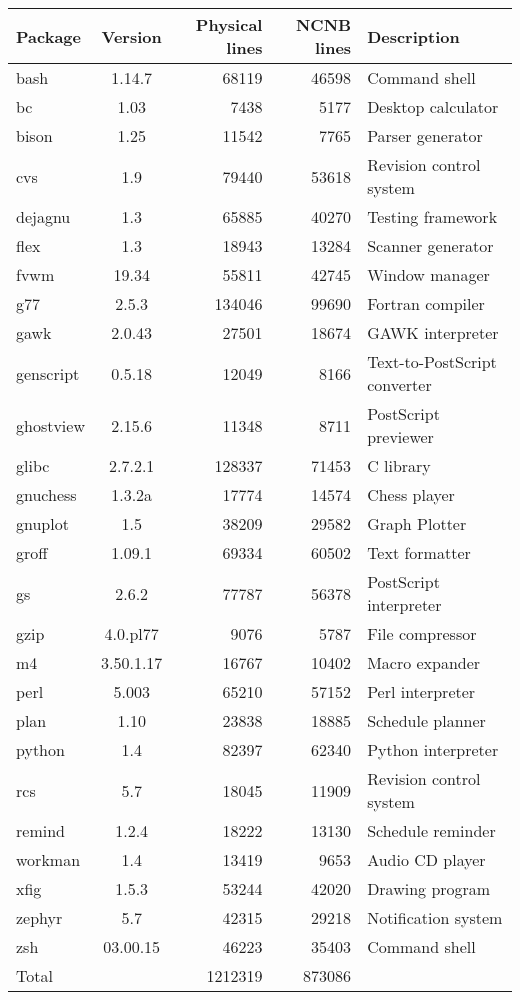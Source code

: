 \begin{tabular}{|l|c|r|r|l|}\hline
Package & Version  & Physical lines & NCNB lines & Description \\ \hline\hline
bash & 1.14.7 & 68119 & 46598 & Command shell \\ \hline
bc & 1.03 & 7438 & 5177 & Desktop calculator \\ \hline
bison & 1.25 & 11542 & 7765 & Parser generator \\ \hline
cvs & 1.9 & 79440 & 53618 & Revision control system \\ \hline
dejagnu & 1.3 & 65885 & 40270 & Testing framework \\ \hline
flex & 1.3 & 18943 & 13284 & Scanner generator \\ \hline
fvwm & 19.34 & 55811 & 42745 & Window manager \\ \hline
g77 & 2.5.3 & 134046 & 99690 & Fortran compiler \\ \hline
gawk & 2.0.43 & 27501 & 18674 & GAWK interpreter \\ \hline
genscript & 0.5.18 & 12049 & 8166 & Text-to-PostScript converter \\ \hline
ghostview & 2.15.6 & 11348 & 8711 & PostScript previewer \\ \hline
glibc & 2.7.2.1 & 128337 & 71453 & C library \\ \hline
gnuchess & 1.3.2a & 17774 & 14574 & Chess player \\ \hline
gnuplot & 1.5 & 38209 & 29582 & Graph Plotter \\ \hline
groff & 1.09.1 & 69334 & 60502 & Text formatter \\ \hline
gs & 2.6.2 & 77787 & 56378 & PostScript interpreter \\ \hline
gzip & 4.0.pl77 & 9076 & 5787 & File compressor \\ \hline
m4 & 3.50.1.17 & 16767 & 10402 & Macro expander \\ \hline
perl & 5.003 & 65210 & 57152 & Perl interpreter \\ \hline
plan & 1.10 & 23838 & 18885 & Schedule planner \\ \hline
python & 1.4 & 82397 & 62340 & Python interpreter \\ \hline
rcs & 5.7 & 18045 & 11909 & Revision control system \\ \hline
remind & 1.2.4 & 18222 & 13130 & Schedule reminder \\ \hline
workman & 1.4 & 13419 & 9653 & Audio CD player \\ \hline
xfig & 1.5.3 & 53244 & 42020 & Drawing program \\ \hline
zephyr & 5.7 & 42315 & 29218 & Notification system \\ \hline
zsh & 03.00.15 & 46223 & 35403 & Command shell \\ \hline\hline
\multicolumn{2}{|l|}{Total} & 1212319 & 873086 & \\ \hline
\end{tabular}
